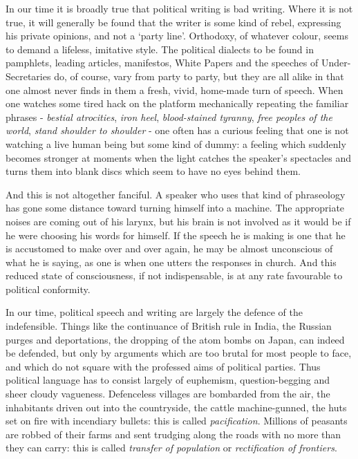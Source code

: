 In our time it is broadly true that political writing is bad writing. Where it is not true, it will generally be found that the writer is some kind of rebel, expressing his private opinions, and not a ‘party line’. Orthodoxy, of whatever colour, seems to demand a lifeless, imitative style. The political dialects to be found in pamphlets, leading articles, manifestos, White Papers and the speeches of Under-Secretaries do, of course, vary from party to party, but they are all alike in that one almost never finds in them a fresh, vivid, home-made turn of speech. When one watches some tired hack on the platform mechanically repeating the familiar phrases - \textit{bestial atrocities}, \textit{iron heel}, \textit{blood-stained tyranny}, \textit{free peoples of the world}, \textit{stand shoulder to shoulder} - one often has a curious feeling that one is not watching a live human being but some kind of dummy: a feeling which suddenly becomes stronger at moments when the light catches the speaker’s spectacles and turns them into blank discs which seem to have no eyes behind them.\par

And this is not altogether fanciful. A speaker who uses that kind of phraseology has gone some distance toward turning himself into a machine. The appropriate noises are coming out of his larynx, but his brain is not involved as it would be if he were choosing his words for himself. If the speech he is making is one that he is accustomed to make over and over again, he may be almost unconscious of what he is saying, as one is when one utters the responses in church. And this reduced state of consciousness, if not indispensable, is at any rate favourable to political conformity.\par

In our time, political speech and writing are largely the defence of the indefensible. Things like the continuance of British rule in India, the Russian purges and deportations, the dropping of the atom bombs on Japan, can indeed be defended, but only by arguments which are too brutal for most people to face, and which do not square with the professed aims of political parties. Thus political language has to consist largely of euphemism, question-begging and sheer cloudy vagueness. Defenceless villages are bombarded from the air, the inhabitants driven out into the countryside, the cattle machine-gunned, the huts set on fire with incendiary bullets: this is called \textit{pacification}. Millions of peasants are robbed of their farms and sent trudging along the roads with no more than they can carry: this is called \textit{transfer of population} or \textit{rectification of frontiers}.\par

